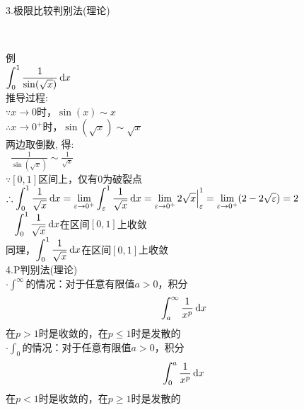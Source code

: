 3.极限比较判别法(理论)
{\par\centering
{}\\[2ex]
\par}
例\\
$\displaystyle\int_0^1\frac{1}{\sin(\sqrt{x})}\mathop{}\!\mathrm{d} x$\\
推导过程:\\
$\because x\to 0$时，$\sin(x)\sim x$\\
$\therefore x\to 0^+$时，$\sin(\sqrt{x})\sim\sqrt{x}$\\
\phantom{$\therefore$}两边取倒数, 得:\\
$\displaystyle\phantom{\therefore}\frac{1}{\sin(\sqrt{x})}\sim\frac{1}{\sqrt{x}}$\\
$\because[0,1]$区间上，仅有$0$为破裂点\\
$\displaystyle\therefore\int_0^1\frac{1}{\sqrt{x}}\mathop{}\!\mathrm{d} x=\lim_{\varepsilon\to 0^+}\int_{\varepsilon}^1\frac{1}{\sqrt{x}}\mathop{}\!\mathrm{d} x=\lim_{\varepsilon\to 0^+}2\sqrt{x}\Big|_{\varepsilon}^1=\lim_{\varepsilon\to 0^+}(2-2\sqrt{\varepsilon})=2$\\
$\displaystyle\phantom{\therefore}\int_0^1\frac{1}{\sqrt{x}}\mathop{}\!\mathrm{d} x$在区间$[0,1]$上收敛\\
同理，$\displaystyle\int_0^1\frac{1}{\sqrt{x}}\mathop{}\!\mathrm{d} x$在区间$[0,1]$上收敛\\[4ex]

4.P判别法(理论)\\
$\displaystyle\cdot\int^{\infty}$的情况：对于任意有限值$a>0$，积分
\[\int_a^{\infty}\frac{1}{x^p}\mathop{}\!\mathrm{d} x\]
\phantom{$\cdot$}在$p>1$时是收敛的，在$p\leqslant 1$时是发散的\\
$\displaystyle\cdot\int_0$的情况：对于任意有限值$a>0$，积分
\[\int_0^a\frac{1}{x^p}\mathop{}\!\mathrm{d} x\]
\phantom{$\cdot$}在$p<1$时是收敛的，在$p\geqslant 1$时是发散的\\[4ex]

